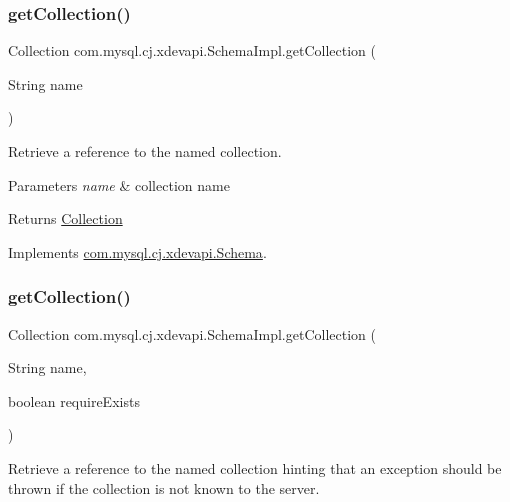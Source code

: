 \subsubsection{\texorpdfstring{get\+Collection()}{getCollection()}\hspace{0.1cm}{\footnotesize\ttfamily [1/2]}}
{\footnotesize\ttfamily Collection com.\+mysql.\+cj.\+xdevapi.\+Schema\+Impl.\+get\+Collection (\begin{DoxyParamCaption}\item[{String}]{name }\end{DoxyParamCaption})}

Retrieve a reference to the named collection.


\begin{DoxyParams}{Parameters}
{\em name} & collection name \\
\hline
\end{DoxyParams}
\begin{DoxyReturn}{Returns}
\mbox{\hyperlink{interfacecom_1_1mysql_1_1cj_1_1xdevapi_1_1_collection}{Collection}} 
\end{DoxyReturn}


Implements \mbox{\hyperlink{interfacecom_1_1mysql_1_1cj_1_1xdevapi_1_1_schema_aeb2f782db94fd4a068b1c1e6b9f3f20e}{com.\+mysql.\+cj.\+xdevapi.\+Schema}}.

\mbox{\label{classcom_1_1mysql_1_1cj_1_1xdevapi_1_1_schema_impl_a465ae06f3ba56080cbc7405ff428f01b}} 
\subsubsection{\texorpdfstring{get\+Collection()}{getCollection()}\hspace{0.1cm}{\footnotesize\ttfamily [2/2]}}
{\footnotesize\ttfamily Collection com.\+mysql.\+cj.\+xdevapi.\+Schema\+Impl.\+get\+Collection (\begin{DoxyParamCaption}\item[{String}]{name,  }\item[{boolean}]{require\+Exists }\end{DoxyParamCaption})}

Retrieve a reference to the named collection hinting that an exception should be thrown if the collection is not known to the server.


